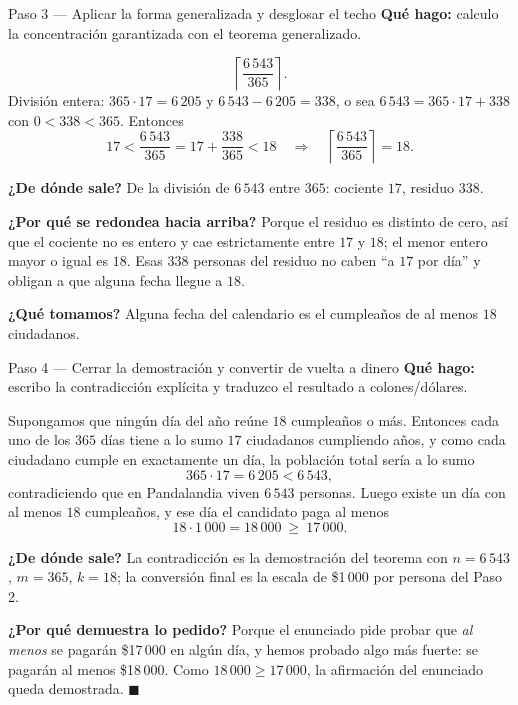 \documentclass[11pt]{article}
\begin{document}
\begin{paso}{Paso 3 --- Aplicar la forma generalizada y desglosar el techo}
\textbf{Qué hago:} calculo la concentración garantizada con el teorema generalizado.

\[
\left\lceil \frac{6\,543}{365} \right\rceil .
\]
División entera: $365\cdot 17 = 6\,205$ y $6\,543-6\,205 = 338$, o sea $6\,543 = 365\cdot 17 + 338$ con $0<338<365$. Entonces
\[
17<\frac{6\,543}{365}=17+\frac{338}{365}<18
\quad\Longrightarrow\quad
\left\lceil \frac{6\,543}{365} \right\rceil = 18 .
\]

\textbf{¿De dónde sale?} De la división de $6\,543$ entre $365$: cociente $17$, residuo $338$.

\textbf{¿Por qué se redondea hacia arriba?} Porque el residuo es distinto de cero, así que el cociente no es entero y cae estrictamente entre $17$ y $18$; el menor entero mayor o igual es $18$. Esas $338$ personas del residuo no caben ``a $17$ por día'' y obligan a que alguna fecha llegue a $18$.

\textbf{¿Qué tomamos?} Alguna fecha del calendario es el cumpleaños de al menos $18$ ciudadanos.
\end{paso}

\begin{paso}{Paso 4 --- Cerrar la demostración y convertir de vuelta a dinero}
\textbf{Qué hago:} escribo la contradicción explícita y traduzco el resultado a colones/dólares.

Supongamos que ningún día del año reúne $18$ cumpleaños o más. Entonces cada uno de los $365$ días tiene a lo sumo $17$ ciudadanos cumpliendo años, y como cada ciudadano cumple en exactamente un día, la población total sería a lo sumo
\[
365\cdot 17 = 6\,205 < 6\,543 ,
\]
contradiciendo que en Pandalandia viven $6\,543$ personas. Luego existe un día con al menos $18$ cumpleaños, y ese día el candidato paga al menos
\[
18\cdot 1\,000 = 18\,000 \ \ge\ 17\,000 .
\]

\textbf{¿De dónde sale?} La contradicción es la demostración del teorema con $n=6\,543$, $m=365$, $k=18$; la conversión final es la escala de \$1\,000 por persona del Paso 2.

\textbf{¿Por qué demuestra lo pedido?} Porque el enunciado pide probar que \emph{al menos} se pagarán \$17\,000 en algún día, y hemos probado algo más fuerte: se pagarán al menos \$18\,000. Como $18\,000\ge 17\,000$, la afirmación del enunciado queda demostrada. $\blacksquare$
\end{paso}
\end{document}
